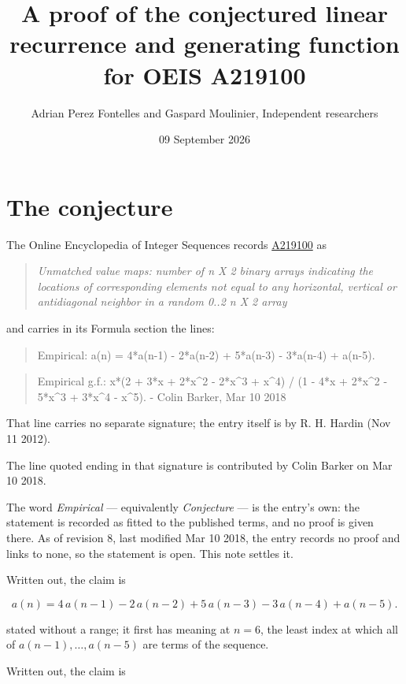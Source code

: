 \documentclass[11pt]{article}
\title{A proof of the conjectured linear recurrence and generating function for OEIS A219100}
\author{Adrian Perez Fontelles and Gaspard Moulinier, Independent researchers}
\date{09 September 2026}
\theoremstyle{definition}
\begin{document}
\maketitle
\section{The conjecture}

The Online Encyclopedia of Integer Sequences records \href{https://oeis.org/A219100}{A219100} as

\begin{quote}\itshape Unmatched value maps: number of n X 2 binary arrays indicating the locations of corresponding elements not equal to any horizontal, vertical or antidiagonal neighbor in a random 0..2 n X 2 array\end{quote}

and carries in its Formula section the lines:

\begin{quote}\ttfamily Empirical: a(n) = 4*a(n-1) - 2*a(n-2) + 5*a(n-3) - 3*a(n-4) + a(n-5).\end{quote}

\begin{quote}\ttfamily Empirical g.f.: x*(2 + 3*x + 2*x\textasciicircum{}2 - 2*x\textasciicircum{}3 + x\textasciicircum{}4) / (1 - 4*x + 2*x\textasciicircum{}2 - 5*x\textasciicircum{}3 + 3*x\textasciicircum{}4 - x\textasciicircum{}5). - Colin Barker, Mar 10 2018\end{quote}

That line carries no separate signature; the entry itself is by R. H. Hardin (Nov 11 2012).

The line quoted ending in that signature is contributed by Colin Barker on Mar 10 2018.

The word {\itshape Empirical} --- equivalently {\itshape Conjecture} --- is the entry's own: the statement is recorded as fitted to the published terms, and no proof is given there. As of revision 8, last modified Mar 10 2018, the entry records no proof and links to none, so the statement is open. This note settles it.

Written out, the claim is

\[a(n) = 4\,a(n-1) - 2\,a(n-2) + 5\,a(n-3) - 3\,a(n-4) + a(n-5).\]

stated without a range; it first has meaning at $n = 6$, the least index at which all of $a(n-1),\dots,a(n-5)$ are terms of the sequence.

Written out, the claim is
\end{document}

